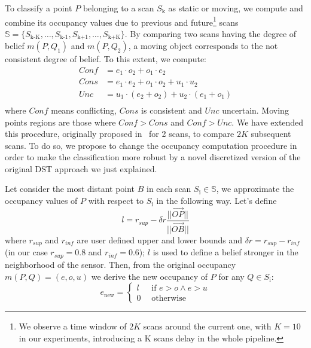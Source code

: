 To classify a point $P$ belonging to a scan $S_{\text{k}}$ as static or moving, we compute and combine its occupancy values due to previous and future\footnote{We observe a time window of $2K$ scans around the current one, with $K=10$ in our experiments, introducing a K scans delay in the whole pipeline.} scans $\mathbb{S} = \{S_{\text{k-K}}, \dots, S_{\text{k-1}}, S_{\text{k+1}}, \dots, S_{\text{k+K}} \}$.
By comparing two scans having the degree of belief $m(P,Q_1)$ and $m(P,Q_2)$, a moving object corresponds to the not consistent degree of belief. To this extent, we compute:
\begin{equation}
 \begin{split}
  Conf &= e_1\cdot o_2 + o_1\cdot e_2\ \\
  Cons &= e_1\cdot e_2 + o_1\cdot o_2 + u_1\cdot u_2\ \\
  Unc\ &= u_1\cdot (e_2 + o_2) + u_2\cdot (e_1 + o_1)\\
 \end{split}
\end{equation}
where $Conf$ means conflicting, $Cons$ is consistent and $Unc$ uncertain. 
Moving points regions are those where $Conf > Cons$ and $Conf > Unc$. 
We have extended this procedure, originally proposed in~\cite{xiao2013change} for 2 scans, to compare $2K$ subsequent scans.
To do so, we propose to change the occupancy computation procedure in order to make the classification more robust by a novel discretized version of the original DST approach we just explained. 

Let consider the most distant point $B$ in each scan $S_{\text{i}} \in \mathbb{S}$, we approximate the occupancy values of $P$ with respect to $S_{\text{i}}$ in the following way. Let's define 
\[
 l = r_{sup} - \delta r\frac{||\overrightarrow{OP}||}{||\overrightarrow{OB}||}
\] 
where $r_{sup}$ and $r_{inf}$ are user defined upper and lower bounds and $\delta r = r_{sup} - r_{inf}$ (in our case  $r_{sup} = 0.8$ and $r_{inf} = 0.6$); $l$ is used to define a belief stronger in the neighborhood of the sensor. Then, from the original occupancy $m(P,Q)=(e, o, u)$ we derive the new occupancy of $P$ for any $Q\in S_{\text{i}}$:
\begin{equation}
 e_{\text{new}} = \begin{cases}
      l\ \ \ &\mbox{if }e > o \wedge e > u \\
      0 &\mbox{otherwise}
     \end{cases}
\end{equation}

